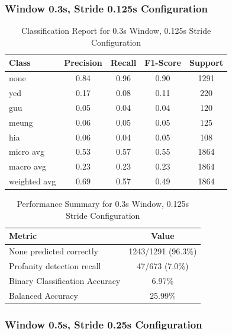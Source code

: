 \documentclass[11pt]{article}
\begin{document}
\subsubsection{Window 0.3s, Stride 0.125s Configuration}

\begin{table}[H]
\centering
\caption{Classification Report for 0.3s Window, 0.125s Stride Configuration}
\begin{tabular}{|l|c|c|c|c|}
\hline
\textbf{Class} & \textbf{Precision} & \textbf{Recall} & \textbf{F1-Score} & \textbf{Support} \\
\hline
none & 0.84 & 0.96 & 0.90 & 1291 \\
yed & 0.17 & 0.08 & 0.11 & 220 \\
guu & 0.05 & 0.04 & 0.04 & 120 \\
meung & 0.06 & 0.05 & 0.05 & 125 \\
hia & 0.06 & 0.04 & 0.05 & 108 \\
\hline
micro avg & 0.53 & 0.57 & 0.55 & 1864 \\
macro avg & 0.23 & 0.23 & 0.23 & 1864 \\
weighted avg & 0.69 & 0.57 & 0.49 & 1864 \\
\hline
\end{tabular}
\end{table}

\begin{table}[H]
\centering
\caption{Performance Summary for 0.3s Window, 0.125s Stride Configuration}
\begin{tabular}{|l|c|}
\hline
\textbf{Metric} & \textbf{Value} \\
\hline
None predicted correctly & 1243/1291 (96.3\%) \\
Profanity detection recall & 47/673 (7.0\%) \\
Binary Classification Accuracy & 6.97\% \\
Balanced Accuracy & 25.99\% \\
\hline
\end{tabular}
\end{table}

\subsubsection{Window 0.5s, Stride 0.25s Configuration}
\end{document}
